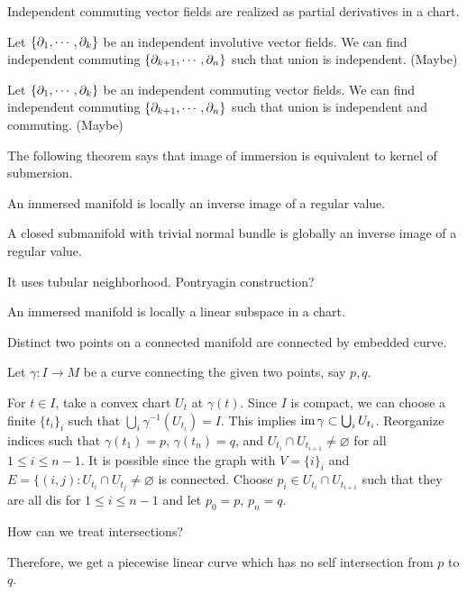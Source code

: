\documentclass[12pt]{article}
\begin{document}
\begin{prop}
Independent commuting vector fields are realized as partial derivatives in a chart.
\end{prop}

\begin{prop}
Let $\{\pd_1,\cdots,\pd_k\}$ be an independent involutive vector fields.
We can find independent commuting $\{\pd_{k+1},\cdots,\pd_n\}$ such that union is independent.
(Maybe)
\end{prop}
\begin{prop}
Let $\{\pd_1,\cdots,\pd_k\}$ be an independent commuting vector fields.
We can find independent commuting $\{\pd_{k+1},\cdots,\pd_n\}$ such that union is independent and commuting.
(Maybe)
\end{prop}

\bigskip



The following theorem says that image of immersion is equivalent to kernel of submersion.
\begin{prop}
An immersed manifold is locally an inverse image of a regular value.
\end{prop}

\begin{prop}
A closed submanifold with trivial normal bundle is globally an inverse image of a regular value.
\end{prop}
\begin{pf}
It uses tubular neighborhood.
Pontryagin construction?
\end{pf}

\begin{prop}
An immersed manifold is locally a linear subspace in a chart.
\end{prop}

\begin{prop}
Distinct two points on a connected manifold are connected by embedded curve.
\end{prop}
\begin{pf}
Let $\gamma:I\to M$ be a curve connecting the given two points, say $p,q$.

For $t\in I$, take a convex chart $U_t$ at $\gamma(t)$.
Since $I$ is compact, we can choose a finite $\{t_i\}_i$ such that $\bigcup_i\gamma^{-1}(U_{t_i})=I$.
This implies $\operatorname{im}\gamma\subset\bigcup_iU_{t_i}$.
Reorganize indices such that $\gamma(t_1)=p$, $\gamma(t_n)=q$, and $U_{t_i}\cap U_{t_{i+1}}\ne\varnothing$ for all $1\le i\le n-1$.
It is possible since the graph with $V=\{i\}_i$ and $E=\{(i,j):U_{t_i}\cap U_{t_j}\ne\varnothing$ is connected.
Choose $p_i\in U_{t_i}\cap U_{t_{i+1}}$ such that they are all dis for $1\le i\le n-1$ and let $p_0=p$, $p_n=q$.

How can we treat intersections?

Therefore, we get a piecewise linear curve which has no self intersection from $p$ to $q$.

\end{pf}
\end{document}
